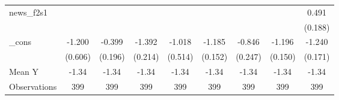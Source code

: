{\begin{tabular}{l*{8}{c}}
\addlinespace
news\_f2s1   &                     &                     &                     &                     &                     &                     &                     &       0.491\sym{**} \\
            &                     &                     &                     &                     &                     &                     &                     &     (0.188)         \\
\addlinespace
\_cons      &      -1.200\sym{*}  &      -0.399\sym{*}  &      -1.392\sym{***}&      -1.018\sym{*}  &      -1.185\sym{***}&      -0.846\sym{***}&      -1.196\sym{***}&      -1.240\sym{***}\\
            &     (0.606)         &     (0.196)         &     (0.214)         &     (0.514)         &     (0.152)         &     (0.247)         &     (0.150)         &     (0.171)         \\
\midrule
Mean Y      &       -1.34         &       -1.34         &       -1.34         &       -1.34         &       -1.34         &       -1.34         &       -1.34         &       -1.34         \\
Observations&         399         &         399         &         399         &         399         &         399         &         399         &         399         &         399         \\
\bottomrule
\end{tabular}
}
